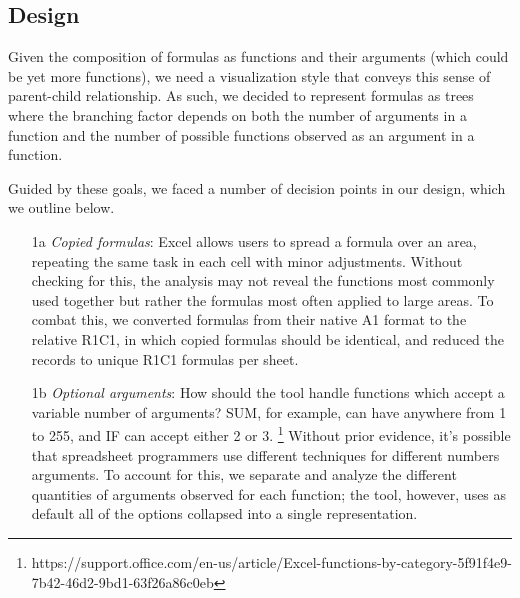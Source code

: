 \documentclass[conference]{IEEEtran}
\begin{document}
\subsection{Design}
Given the composition of formulas as functions and their arguments (which could be yet more functions), we need a visualization style that conveys this sense of parent-child relationship. As such, we decided to represent formulas as trees where the branching factor depends on both the number of arguments in a function and the number of possible functions observed as an argument in a function. \par
Guided by these goals, we faced a number of decision points in our design, which we outline below.


\begin{itemize}
	\item [1a] \textit{Copied formulas}: Excel allows users to spread a formula over an area, repeating the same task in each cell with minor adjustments. Without checking for this, the analysis may not reveal the functions most commonly used together but rather the formulas most often applied to large areas. To combat this, we converted formulas from their native A1 format to the relative R1C1, in which copied formulas should be identical, and reduced the records to unique R1C1 formulas per sheet.
	\item [1b] \textit{Optional arguments}: How should the tool handle functions which accept a variable number of arguments? SUM, for example, can have anywhere from 1 to 255, and IF can accept either 2 or 3. \footnote{https://support.office.com/en-us/article/Excel-functions-by-category-5f91f4e9-7b42-46d2-9bd1-63f26a86c0eb} Without prior evidence, it's possible that spreadsheet programmers use different techniques for different numbers arguments. To account for this, we separate and analyze the different quantities of arguments observed for each function; the tool, however, uses as default all of the options collapsed into a single representation.
\end{itemize}
\end{document}
